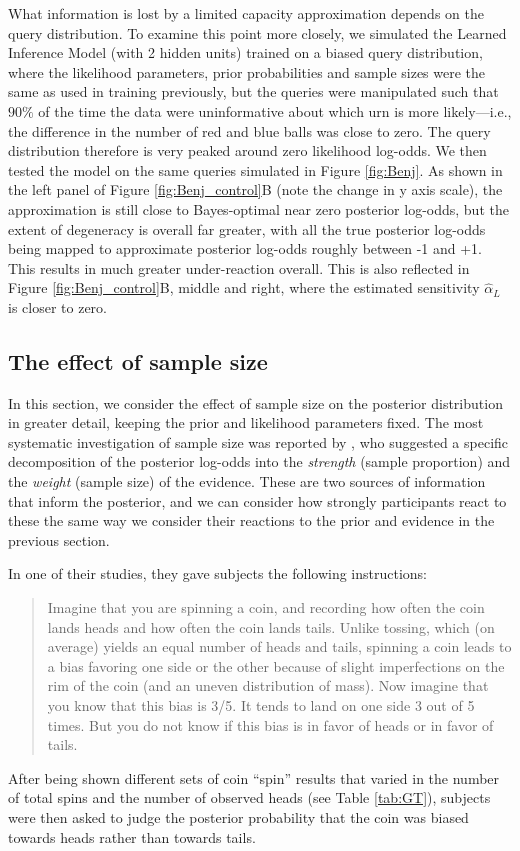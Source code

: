 What information is lost by a limited capacity approximation depends on the query distribution. To examine this point more closely, we simulated the Learned Inference Model (with 2 hidden units) trained on a biased query distribution, where the likelihood parameters, prior probabilities and sample sizes were the same as used in training previously, but the queries were manipulated such that $90\%$ of the time the data were uninformative about which urn is more likely---i.e., the difference in the number of red and blue balls was close to zero. The query distribution therefore is very peaked around zero likelihood log-odds. We then tested the model on the same queries simulated in Figure \ref{fig:Benj}. As shown in the left panel of Figure \ref{fig:Benj_control}B (note the change in y axis scale), the approximation is still close to Bayes-optimal near zero posterior log-odds, but the extent of degeneracy is overall far greater, with all the true posterior log-odds being mapped to approximate posterior log-odds roughly between -1 and +1. This results in much greater under-reaction overall. This is also reflected in Figure \ref{fig:Benj_control}B, middle and right, where the estimated sensitivity $\hat{\alpha}_L$ is closer to zero.

\subsection{The effect of sample size}

In this section, we consider the effect of sample size on the posterior distribution in greater detail, keeping the prior and likelihood parameters fixed. The most systematic investigation of sample size was reported by \cite{griffin1992weighing}, who suggested a specific decomposition of the posterior log-odds into the \emph{strength} (sample proportion) and the \emph{weight} (sample size) of the evidence. These are two sources of information that inform the posterior, and we can consider how strongly participants react to these the same way we consider their reactions to the prior and evidence in the previous section.

In one of their studies, they gave subjects the following instructions:
\begin{quote}
Imagine that you are spinning a coin, and recording how often the coin lands heads and how often the coin lands tails. Unlike tossing, which (on average) yields an equal number of heads and tails, spinning a coin leads to a bias favoring one side or the other because of slight imperfections on the rim of the coin (and an uneven distribution of mass). Now imagine that you know that this bias is 3/5. It tends to land on one side 3 out of 5 times. But you do not know if this bias is in favor of heads or in favor of tails. 
\end{quote}
After being shown different sets of coin ``spin'' results that varied in the number of total spins and the number of observed heads (see Table \ref{tab:GT}), subjects were then asked to judge the posterior probability that the coin was biased towards heads rather than towards tails.

